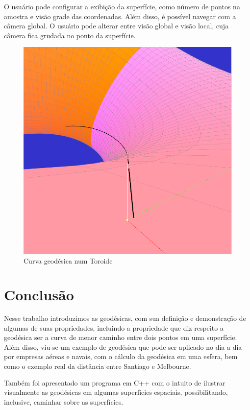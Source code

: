 \documentclass{article}
\begin{document}
O usuário pode configurar a exibição da superfície, como número de pontos na amostra e visão grade das coordenadas. Além disso, é possível navegar com a câmera global. O usuário pode alterar entre visão global e visão local, cuja câmera fica grudada no ponto da superfície.

\begin{figure}
    \centering
    \includegraphics[scale = 0.5]{Imagens/torus.png}
    \caption{Curva geodésica num Toroide}
    \label{torus}
\end{figure}

\section{Conclusão}

Nesse trabalho introduzimos as geodésicas, com sua definição e demonstração de algumas de suas propriedades, incluindo a propriedade que diz respeito a geodésica ser a curva de menor caminho entre dois pontos em uma superfície. Além disso, viu-se um exemplo de geodésica que pode ser aplicado no dia a dia por empresas aéreas e navais, com o cálculo da geodésica em uma esfera, bem como o exemplo real da distância entre Santiago e Melbourne.

Também foi apresentado um programa em C++ com o intuito de ilustrar visualmente as geodésicas em algumas superfícies espaciais, possibilitando, inclusive, caminhar sobre as superfícies.
\end{document}
